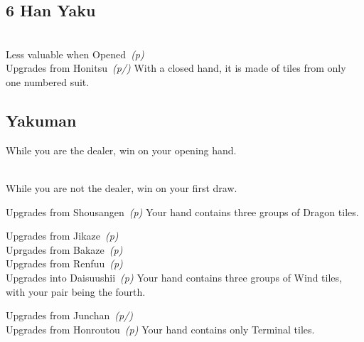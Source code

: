 \subsection{6 Han Yaku}\label{core:ssec:6-han-yaku}

	{\closedhand \\
	\lessvaluable Less valuable when Opened~\textit{(p\pageref{core:yaku:Chinitsu})} \\
	\upgradesfrom Upgrades from Honitsu~\textit{(p\pageref{core:yaku:Honitsu}/\pageref{core:yaku:Menzen Honitsu})}}
	{With a closed hand, it is made of tiles from only one numbered suit.}

\subsection{Yakuman}\label{core:ssec:yakuman-yaku}

	{\closedhand}
	{While you are the dealer, win on your opening hand.}

	{\closedhand \\
	\brokenhand}
	{While you are not the dealer, win on your first draw.}

	{\upgradesfrom Upgrades from Shousangen~\textit{(p{\pageref{core:yaku:Shousangen}})}}
	{Your hand contains three groups of Dragon tiles.}

	{\upgradesfrom Upgrades from Jikaze~\textit{(p\pageref{core:yaku:Jikaze})}\\
	\upgradesfrom Uprgades from Bakaze~\textit{(p\pageref{core:yaku:Bakaze})}\\
	\upgradesfrom Upgrades from Renfuu~\textit{(p\pageref{core:yaku:Renfuu})} \\
	\upgradesto Upgrades into Daisuushii~\textit{(p\pageref{core:yaku:Daisuushii})}}
	{Your hand contains three groups of Wind tiles, with your pair being the fourth.}

	{\upgradesfrom Upgrades from Junchan~\textit{(p\pageref{core:yaku:Junchan}/\pageref{core:yaku:Menzen Junchan})} \\
	\upgradesfrom Upgrades from Honroutou~\textit{(p\pageref{core:yaku:Honroutou})}}
	{Your hand contains only Terminal tiles.}


